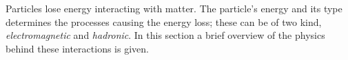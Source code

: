 Particles lose energy interacting with matter. The particle's energy and its
type determines the processes causing the energy loss; these can be of two kind,
\emph{electromagnetic} and \emph{hadronic}. In this section a brief overview of
the physics behind these interactions is given.
